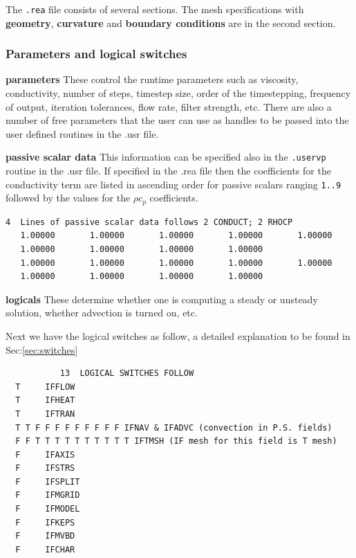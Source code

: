 
The {\tt .rea} file consists of several sections. The mesh specifications  with {\bf geometry}, {\bf curvature} and {\bf boundary conditions} are in the second section.

\subsubsection*{ Parameters and logical switches}
\begin{description}
\item{\bf parameters} These control the runtime parameters such as viscosity,
    conductivity, number of steps, timestep size, order of the timestepping,
    frequency of output, iteration tolerances, flow rate, filter strength,
    etc.   There are also a number of free parameters that the user can
    use as handles to be passed into the user defined routines in the .usr file.
\item{\bf passive scalar data} This information can be specified also in the \texttt{.uservp} routine in the .usr file. If specified in the .rea file then the coefficients for the conductivity term are listed in ascending order for passive scalars ranging \texttt{1..9} followed by the values for the \(\rho c_p\) coefficients.
\begin{verbatim}
4  Lines of passive scalar data follows 2 CONDUCT; 2 RHOCP
   1.00000       1.00000       1.00000       1.00000       1.00000
   1.00000       1.00000       1.00000       1.00000
   1.00000       1.00000       1.00000       1.00000       1.00000
   1.00000       1.00000       1.00000       1.00000
\end{verbatim}
\item{\bf logicals} These determine whether one is computing a steady or unsteady
  solution, whether advection is turned on, etc.
\end{description}

Next we have the logical switches as follow, a detailed explanation to be found in Sec:\ref{sec:switches}
\begin{verbatim}
           13  LOGICAL SWITCHES FOLLOW
  T     IFFLOW
  T     IFHEAT
  T     IFTRAN
  T T F F F F F F F F F IFNAV & IFADVC (convection in P.S. fields)
  F F T T T T T T T T T T IFTMSH (IF mesh for this field is T mesh)
  F     IFAXIS
  F     IFSTRS
  F     IFSPLIT
  F     IFMGRID
  F     IFMODEL
  F     IFKEPS
  F     IFMVBD
  F     IFCHAR
\end{verbatim}
